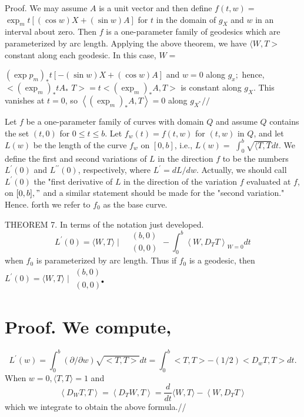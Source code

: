 \documentclass[10pt]{article}
\begin{document}
Proof. We may assume $A$ is a unit vector and then define $f(t, w)=$ $\exp _{m} t[(\cos w) X+(\sin w) A]$ for $t$ in the domain of $g_{X}$ and $w$ in an interval about zero. Then $f$ is a one-parameter family of geodesics which are parameterized by arc length. Applying the above theorem, we have $\langle W, T>$ constant along each geodesic. In this case, $W=$

$\left(\exp p_{m}\right)_{*} t[-(\sin w) X+(\cos w) A]$ and $w=0$ along $g_{x} ;$ hence, $<\left(\exp _{m}\right)_{*} t A_{*}$ $T>=t<\left(\exp _{m}\right)_{*} A, T>$ is constant along $g_{X}$. This vanishes at $t=0$, so $\left\langle\left(\exp _{m}\right)_{*} A, T\right\rangle=0$ along $g_{X^{*}} / /$

Let $f$ be a one-parameter family of curves with domain $Q$ and assume $Q$ contains the set $(t, 0)$ for $0 \leq t \leq b$. Let $f_{w}(t)=f(t, w)$ for $(t, w)$ in $Q$, and let $L(w)$ be the length of the curve $f_{w}$ on $[0, b]$, i.e., $L(w)=$ $\int_{0}^{b} \sqrt{\langle T, T} d t$. We define the first and second variations of $L$ in the direction $f$ to be the numbers $L^{\prime}(0)$ and $L^{\prime \prime}(0)$, respectively, where $L^{\prime}=d L / d w .$ Actually, we should call $L^{\prime}(0)$ the "first derivative of $L$ in the direction of the variation $f$ evaluated at $f$, on $[0, b], "$ and a similar statement should be made for the "second variation." Hence. forth we refer to $f_{0}$ as the base curve.

THEOREM 7. In terms of the notation just developed.
$$
L^{\prime}(0)=\langle W, T\rangle \mid \begin{aligned}
&(b, 0) \\
&(0,0)
\end{aligned}-\int_{0}^{b}\left\langle W, D_{T} T\right\rangle_{W=0} d t
$$
when $f_{0}$ is parameterized by arc length. Thus if $f_{0}$ is a geodesic, then $L^{\prime}(0)=\langle W, T\rangle \mid \begin{array}{ll}(b, 0) \\ (0,0)^{\bullet}\end{array}$

\section{Proof. We compute,}
$$
L^{\prime}(w)=\int_{0}^{b}(\partial / \partial w) \sqrt{<T, T>} d t=\int_{0}^{b}<T, T>-(1 / 2)<D{ }_{w} T, T>d t .
$$
When $w=0,\langle T, T\rangle=1$ and
$$
\left\langle D_{W} T, T\right\rangle=\left\langle D_{T} W, T\right\rangle=\frac{d}{d t}\langle W, T\rangle-\left\langle W, D_{T} T\right\rangle
$$
which we integrate to obtain the above formula.//
\end{document}
